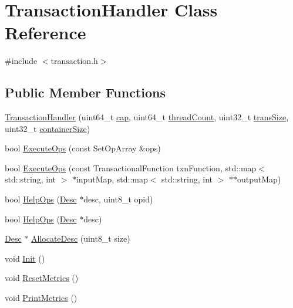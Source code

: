 \hypertarget{classTransactionHandler}{}\section{Transaction\+Handler Class Reference}
\label{classTransactionHandler}


{\ttfamily \#include $<$transaction.\+h$>$}

\subsection*{Public Member Functions}
\begin{DoxyCompactItemize}
\item 
\hyperlink{classTransactionHandler_a404c600bc3f9fd8371b3fdeaba9218eb}{Transaction\+Handler} (uint64\+\_\+t \hyperlink{classTransactionHandler_a2cf5ca7f79dbfed3c2a74524c510fce9}{cap}, uint64\+\_\+t \hyperlink{classTransactionHandler_aa836fefbe472dc6db2915ea723f148ef}{thread\+Count}, uint32\+\_\+t \hyperlink{classTransactionHandler_a9a2c1b281ece3123c6a18fc85a335ce4}{trans\+Size}, uint32\+\_\+t \hyperlink{classTransactionHandler_a97ca9af5f1ca5765520a73e5cd2fb554}{container\+Size})
\item 
bool \hyperlink{classTransactionHandler_a7f1d93e636488df03a246fd45fd53940}{Execute\+Ops} (const Set\+Op\+Array \&ops)
\item 
bool \hyperlink{classTransactionHandler_a95ade690079da04669ff14bbd2323052}{Execute\+Ops} (const Transactional\+Function txn\+Function, std\+::map$<$ std\+::string, int $>$ $\ast$input\+Map, std\+::map$<$ std\+::string, int $>$ $\ast$$\ast$output\+Map)
\item 
bool \hyperlink{classTransactionHandler_a692b676ca2167e5d5672b7f18ba72647}{Help\+Ops} (\hyperlink{structDesc}{Desc} $\ast$desc, uint8\+\_\+t opid)
\item 
bool \hyperlink{classTransactionHandler_a418edee7734a307fced6e4280e6fa5f0}{Help\+Ops} (\hyperlink{structDesc}{Desc} $\ast$desc)
\item 
\hyperlink{structDesc}{Desc} $\ast$ \hyperlink{classTransactionHandler_a6fccb1b26e250f6d4c2bcf4b196f7837}{Allocate\+Desc} (uint8\+\_\+t size)
\item 
void \hyperlink{classTransactionHandler_a9f45dc37682c5bee0f80785c0e79ce01}{Init} ()
\item 
void \hyperlink{classTransactionHandler_af5fb6686d702424f7fa6cc5e94f5696c}{Reset\+Metrics} ()
\item 
void \hyperlink{classTransactionHandler_a2e87e8be283890fd847fd8fb120a5537}{Print\+Metrics} ()
\end{DoxyCompactItemize}
